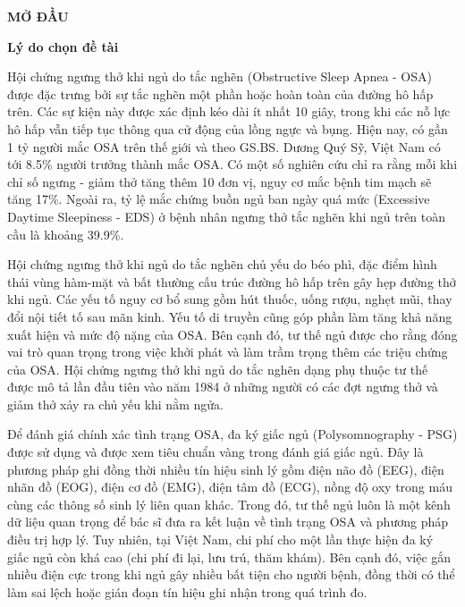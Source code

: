\begin{center}
  \textbf{MỞ ĐẦU}
\end{center}
\textbf{Lý do chọn đề tài}

Hội chứng ngưng thở khi ngủ do tắc nghẽn (Obstructive Sleep Apnea - OSA) được
đặc trưng bởi sự tắc nghẽn một phần hoặc hoàn toàn của đường hô hấp trên. Các
sự kiện này được xác định kéo dài ít nhất 10 giây, trong khi các nỗ lực hô hấp
vẫn tiếp tục thông qua cử động của lồng ngực và bụng.
Hiện nay, có gần 1 tỷ người mắc OSA trên thế giới và theo GS.BS. Dương Quý Sỹ,
Việt Nam có tới 8.5\% người trưởng thành mắc OSA.
Có một số nghiên cứu chỉ ra rằng mỗi khi chỉ số ngưng - giảm thở tăng thêm 10
đơn vị, nguy cơ mắc bệnh tim mạch sẽ tăng 17\%.
Ngoài ra, tỷ lệ mắc chứng buồn ngủ ban ngày quá mức (Excessive Daytime
Sleepiness - EDS) ở bệnh nhân ngưng thở tắc nghẽn khi ngủ trên toàn cầu là
khoảng 39.9\%.

Hội chứng ngưng thở khi ngủ do tắc nghẽn chủ yếu do béo phì, đặc điểm hình thái
vùng hàm-mặt và bất thường cấu trúc đường hô hấp trên gây hẹp đường thở khi
ngủ.
Các yếu tố nguy cơ bổ sung gồm hút thuốc, uống rượu, nghẹt mũi, thay đổi nội
tiết tố sau mãn kinh. Yếu tố di truyền cũng góp phần làm tăng khả năng xuất
hiện và mức độ nặng của OSA. Bên cạnh đó, tư thế ngủ được cho rằng đóng vai trò
quan trọng trong việc khởi phát và làm trầm trọng thêm các triệu chứng của OSA.
Hội chứng ngưng thở khi ngủ do tắc nghẽn dạng phụ thuộc tư thế được mô tả lần
đầu tiên vào năm 1984 ở những người có các đợt ngưng thở và giảm thở xảy ra chủ
yếu khi nằm ngửa.

Để đánh giá chính xác tình trạng OSA, đa ký giấc ngủ
(Polysomnography - PSG) được sử dụng và được xem tiêu chuẩn vàng trong đánh giá giấc ngủ.
Đây là phương pháp ghi đồng thời nhiều tín hiệu sinh lý
gồm điện não đồ (EEG), điện nhãn đồ (EOG), điện cơ đồ (EMG), điện tâm đồ (ECG), nồng độ oxy trong máu cùng các thông số sinh lý liên quan khác.
Trong đó, tư thế ngủ luôn là một kênh dữ liệu quan trọng để bác sĩ đưa ra kết
luận về tình trạng OSA và phương pháp điều trị hợp lý. Tuy nhiên, tại Việt Nam,
chi phí cho một lần thực hiện đa ký giấc ngủ còn khá cao (chi phí đi lại, lưu
trú, thăm khám). Bên cạnh đó, việc gắn nhiều điện cực trong khi ngủ gây nhiều
bất tiện cho người bệnh, đồng thời có thể làm sai lệch hoặc gián đoạn tín hiệu
ghi nhận trong quá trình đo.

